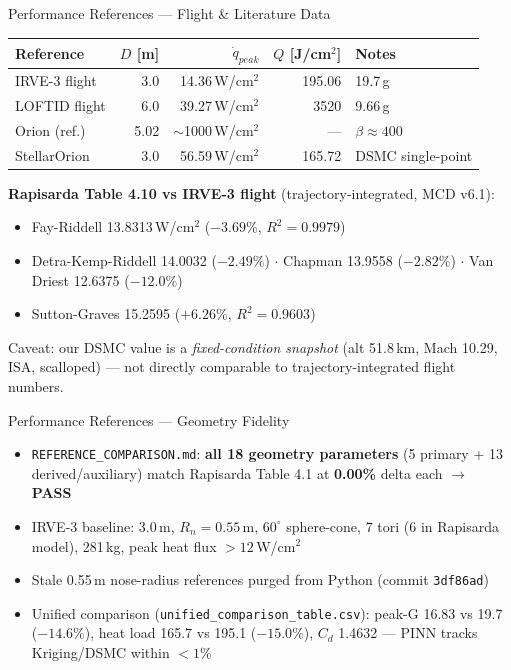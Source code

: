 \documentclass[aspectratio=169,10pt]{beamer}
\begin{document}
\begin{frame}{Performance References --- Flight \& Literature Data}
  \small
  \begin{tabular}{@{}lrrrl@{}}
    \toprule
    Reference & $D$ [m] & $\dot{q}_{peak}$ & $Q$ [J/cm$^2$] & Notes \\
    \midrule
    IRVE-3 flight & 3.0 & 14.36\,W/cm$^2$ & 195.06 & 19.7\,g \\
    LOFTID flight & 6.0 & 39.27\,W/cm$^2$ & 3520 & 9.66\,g \\
    Orion (ref.) & 5.02 & $\sim$1000\,W/cm$^2$ & --- & $\beta\approx400$ \\
    StellarOrion & 3.0 & 56.59\,W/cm$^2$ & 165.72 & DSMC single-point \\
    \bottomrule
  \end{tabular}
  \vspace{6pt}

  \textbf{Rapisarda Table 4.10 vs IRVE-3 flight} (trajectory-integrated,
  MCD v6.1):
  \begin{itemize}
    \item Fay-Riddell 13.8313\,W/cm$^2$ ($-3.69\%$, $R^2=0.9979$)
    \item Detra-Kemp-Riddell 14.0032 ($-2.49\%$) $\cdot$ Chapman 13.9558
          ($-2.82\%$) $\cdot$ Van Driest 12.6375 ($-12.0\%$)
    \item Sutton-Graves 15.2595 ($+6.26\%$, $R^2=0.9603$)
  \end{itemize}
  \vspace{2pt}
  {\footnotesize Caveat: our DSMC value is a \emph{fixed-condition
  snapshot} (alt 51.8\,km, Mach 10.29, ISA, scalloped) --- not directly
  comparable to trajectory-integrated flight numbers.}
\end{frame}

\begin{frame}{Performance References --- Geometry Fidelity}
  \begin{itemize}
    \item \texttt{REFERENCE\_COMPARISON.md}: \textbf{all 18 geometry
          parameters} (5 primary + 13 derived/auxiliary) match Rapisarda
          Table 4.1 at \textbf{0.00\%} delta each $\rightarrow$
          \textbf{PASS}
    \item IRVE-3 baseline: 3.0\,m, $R_n=0.55$\,m, $60^\circ$
          sphere-cone, 7 tori (6 in Rapisarda model), 281\,kg, peak heat flux
          $>12$\,W/cm$^2$
    \item Stale 0.55\,m nose-radius references purged from Python
          (commit \texttt{3df86ad})
    \item Unified comparison (\texttt{unified\_comparison\_table.csv}):
          peak-G 16.83 vs 19.7 ($-14.6\%$), heat load 165.7 vs 195.1
          ($-15.0\%$), $C_d$ 1.4632 --- PINN tracks Kriging/DSMC within
          $<1\%$
  \end{itemize}
\end{frame}
\end{document}
